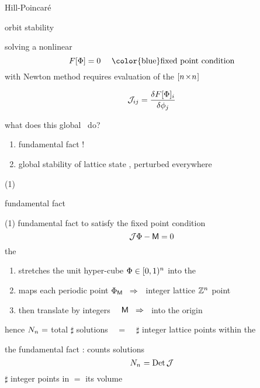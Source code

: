 \begin{frame}{Hill-Poincar\'e}
\vfill
\begin{center}
{\huge orbit stability}
\end{center}
\vfill
\end{frame} %

\begin{frame}{\jacobianOrb}
solving a nonlinear
\[
F[\Xx]=0 \quad \mbox{ \color{blue}fixed point condition}
\]
with Newton method requires evaluation of
the $[{n_{}}\!\times\!{n_{}}]$
    \begin{block}{\jacobianOrb}
\[
{\cal J}_{ij} =\frac{\delta F[\Phi]_i}{\delta \phi_j}
\] %
    \end{block}

what does this global \jacobianOrb\ do?
\bigskip

\begin{enumerate}
              \item
fundamental fact {\color{red}!}
              \item
global stability of lattice state \Xx, perturbed everywhere
            \end{enumerate}
\end{frame} %

\begin{frame}{(1)}
\vfill
\begin{center}
{\huge fundamental fact}
\end{center}
\vfill
\end{frame} %

\begin{frame}{(1) fundamental fact}
to satisfy the fixed point condition
\[
{\cal J}\Phi-\mathsf{M} = 0
\]
the
 {\jacobianOrb} \jMorb\
\begin{enumerate}
              \item
stretches the unit hyper-cube $\Phi\in[0,1)^{n_{}}$ into the \cl{}\dmn\
{\color{blue}\fundPip}
              \item
maps each periodic point ${\Phi}_{\mathsf{M}}\;\;\Rightarrow\;\;$ integer lattice
$\mathbb{Z}^{n_{}}$ point
              \item
then translate by integers ~~$\mathsf{M}\;\;\Rightarrow\;\;$ into the origin
            \end{enumerate}
hence $N_{n_{}} =$ total $\sharp$ solutions ~~=~~ $\sharp$
integer lattice points within the {\fundPip}

\bigskip

the {\color{blue}fundamental fact} :
{\color{blue}\HillDet} counts solutions
\[
N_{n_{}} = \mbox{\rm Det}\,{\cal J}
\] %
$\sharp$ integer points in {\fundPip} $=$ its volume
\end{frame} %

